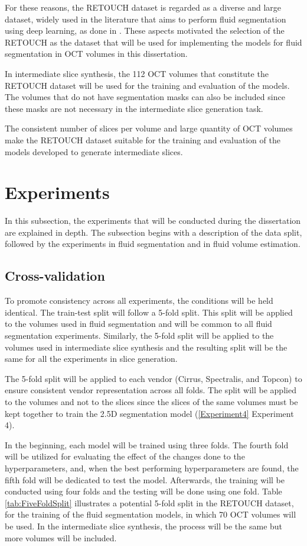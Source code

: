 \par
For these reasons, the RETOUCH dataset is regarded as a diverse and large dataset, widely used in the literature that aims to perform fluid segmentation using deep learning, as done in \parencite{Rahil2023, Zhang2023, Xing2022, Tang2022, Liu2024, Li2023, Hassan2021b, Lu2019}. These aspects motivated the selection of the RETOUCH as the dataset that will be used for implementing the models for fluid segmentation in OCT volumes in this dissertation.
\par
In intermediate slice synthesis, the 112 OCT volumes that constitute the RETOUCH dataset will be used for the training and evaluation of the models. The volumes that do not have segmentation masks can also be included since these masks are not necessary in the intermediate slice generation task.
\par
The consistent number of slices per volume and large quantity of OCT volumes make the RETOUCH dataset suitable for the training and evaluation of the models developed to generate intermediate slices.

\section{Experiments}\label{Experiments}
In this subsection, the experiments that will be conducted during the dissertation are explained in depth. The subsection begins with a description of the data split, followed by the experiments in fluid segmentation and in fluid volume estimation.

\subsection{Cross-validation}
To promote consistency across all experiments, the conditions will be held identical. The train-test split will follow a 5-fold split. This split will be applied to the volumes used in fluid segmentation and will be common to all fluid segmentation experiments. Similarly, the 5-fold split will be applied to the volumes used in intermediate slice synthesis and the resulting split will be the same for all the experiments in slice generation.
\par 
The 5-fold split will be applied to each vendor (Cirrus, Spectralis, and Topcon) to ensure consistent vendor representation across all folds. The split will be applied to the volumes and not to the slices since the slices of the same volumes must be kept together to train the 2.5D segmentation model (\ref{Experiment4} Experiment 4).
\par
In the beginning, each model will be trained using three folds. The fourth fold will be utilized for evaluating the effect of the changes done to the hyperparameters, and, when the best performing hyperparameters are found, the fifth fold will be dedicated to test the model. Afterwards, the training will be conducted using four folds and the testing will be done using one fold. Table \ref{tab:FiveFoldSplit} illustrates a potential 5-fold split in the RETOUCH dataset, for the training of the fluid segmentation models, in which 70 OCT volumes will be used. In the intermediate slice synthesis, the process will be the same but more volumes will be included.

